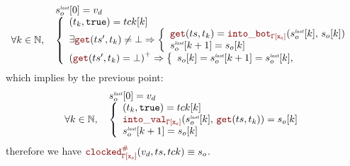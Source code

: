 \begin{skippableproof}
\begin{equation*}
\begin{array}{ll}
                                 & s_o^\explast[0] = v_d \\
            \forall k \in \N, \, &
            \left\{
            \begin{array}{l}
                (t_k, \true) = \tck[k] \\
                \exists \getAt{\ts'}{t_k} \neq \bot \Rightarrow
                \left\{
                \begin{array}{l}
                    \getAt{\ts}{t_k} = \intoBot{\tyCtx[x_o]}{s_o^\explast[k]}{s_o[k]} \\
                    s_o^\explast[k+1] = s_o[k]                                        \\
                \end{array}
                \right.                \\
                \left(\getAt{\ts'}{t_k} = \bot\right)^+ \Rightarrow
                \left\{
                \begin{array}{l}
                    s_o[k] = s_o^\explast[k+1] = s_o^\explast[k], \\
                \end{array}
                \right.
            \end{array}
            \right.
        \end{array}
    \end{equation*}
    which implies by the previous point:
    \begin{equation*}
        \begin{array}{ll}
                                 & s_o^\explast[0] = v_d \\
            \forall k \in \N, \, &
            \left\{
            \begin{array}{l}
                (t_k, \true) = \tck[k]                                            \\
                \intoVal{\tyCtx[x_o]}{s_o^\explast[k]}{\getAt{\ts}{t_k}} = s_o[k] \\
                s_o^\explast[k+1] = s_o[k]
            \end{array}
            \right.
        \end{array}
    \end{equation*}
    therefore we have $\clocked{\tyCtx[x_o]}{v_d}{\ts}{\tck} \equiv s_o$.


\end{skippableproof}
